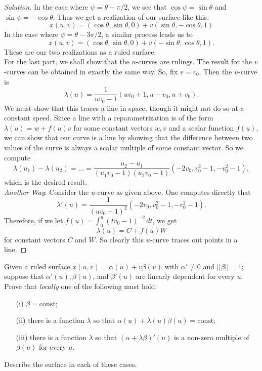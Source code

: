 \documentclass[Shifrin_Solutions_Spring_2015]{subfiles}
\begin{document}
\begin{proof}[Solution]
In the case where $\psi = \theta - \pi/2$, we see that $\cos\psi = \sin\theta$ and $\sin\psi = -\cos\theta$. Thus we get a realization of our surface like this:
\[
x(u,v) = \left( \cos\theta, \sin\theta , 0 \right) + v \left(\sin\theta , -\cos\theta, 1\right)
\]
In the case where $\psi = \theta - 3\pi/2$, a similar process leads us to
\[
x(u,v) = \left( \cos\theta, \sin\theta , 0 \right) + v \left(-\sin\theta , \cos\theta, 1\right).
\]
These are our two realizations as a ruled surface.\\

For the last part, we shall show that the $u$-curves are rulings. The result for the $v$-curves can be obtained in exactly the same way. So, fix $v= v_0$. Then the $u$-curve is
\[
\lambda(u) = \dfrac{1}{uv_0 -1}\left( uv_0 + 1 , u-v_0 , u+v_0\right).
\]
We must show that this traces a line in space, though it might not do so at a constant speed. Since a line with a reparametrization is of the form $\lambda(u) = w + f(u) v$ for some constant vectors $w, v$ and a scalar function $f(u)$, we can show that our curve is a line by showing that the difference between two values of the curve is always a scalar multiple of some constant vector. So we compute
\[
\lambda(u_1) - \lambda(u_2) = \dots = \dfrac{u_2-u_1}{(u_1v_0 -1)(u_2v_0-1)}\left( -2v_0 , v_0^2-1 , -v_0^2-1\right),
\]
which is the desired result.\\

\noindent\emph{Another Way}: Consider the $u$-curve as given above. One computes directly that
\[
\lambda'(u) = \dfrac{1}{(uv_0-1)^2} \left( -2v_0, v_0^2 - 1, -v_0^2-1\right).
\]
Therefore, if we let $f(u) = \int_0^u (tv_0-1)^{-2}\, dt$, we get
\[
\lambda(u) = C + f(u) W
\]
for constant vectors $C$ and $W$. So clearly this $u$-curve traces out points in a line.

\end{proof}



\begin{exercise}
Given a ruled surface $x(u,v) = \alpha(u) + v\beta(u)$ with $\alpha' \neq 0$ and $||\beta||=1$; suppose that $\alpha'(u), \beta(u)$, and $\beta'(u)$ are linearly dependent for every $u$. Prove that \emph{locally} one of the following must hold:
\begin{itemize}
\item[(i)] $\beta = \text{const}$;
\item[(ii)] there is a function $\lambda$ so that $\alpha(u) + \lambda(u) \beta(u) = \text{const}$;
\item[(iii)] there is a function $\lambda$ so that $(\alpha + \lambda \beta)'(u)$ is a non-zero multiple of $\beta(u)$ for every $u$.
\end{itemize}
Describe the surface in each of these cases.
\end{exercise}
\end{document}
